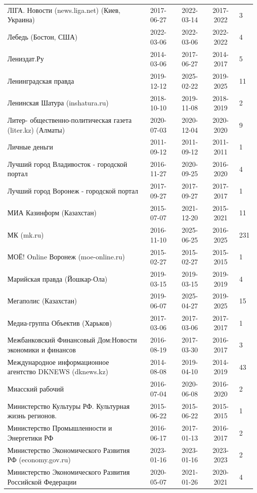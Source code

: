 \begin{longtable}{p{6cm}cccp{2cm}}
ЛIГА. Новости (news.liga.net) (Киев, Украина) & 2017-06-27 & 2022-03-14 & 2017-2022 & 3\\
Лебедь (Бостон, США) & 2022-03-06 & 2022-03-06 & 2022-2022 & 4\\
Лениздат.Ру & 2014-03-06 & 2017-06-27 & 2014-2017 & 5\\
Ленинградская правда & 2019-12-12 & 2025-02-22 & 2019-2025 & 11\\
Ленинская Шатура (inshatura.ru) & 2018-10-10 & 2019-11-08 & 2018-2019 & 2\\
Литер- общественно-политическая газета (liter.kz) (Алматы) & 2020-07-03 & 2020-12-04 & 2020-2020 & 9\\
Личные деньги & 2011-09-12 & 2011-09-12 & 2011-2011 & 1\\
Лучший город Владивосток - городской портал & 2016-11-27 & 2020-09-25 & 2016-2020 & 4\\
Лучший город Воронеж - городской портал & 2017-09-27 & 2017-09-27 & 2017-2017 & 1\\
МИА Казинформ (Казахстан) & 2015-07-07 & 2021-12-20 & 2015-2021 & 11\\
МК (mk.ru) & 2016-11-10 & 2025-06-25 & 2016-2025 & 231\\
МОЁ! Online Воронеж (moe-online.ru) & 2015-02-27 & 2015-02-27 & 2015-2015 & 1\\
Марийская правда (Йошкар-Ола) & 2019-03-15 & 2019-03-15 & 2019-2019 & 4\\
Мегаполис (Казахстан) & 2019-06-07 & 2025-04-27 & 2019-2025 & 15\\
Медиа-группа Объектив (Харьков) & 2017-03-06 & 2017-03-06 & 2017-2017 & 1\\
Межбанковский Финансовый Дом:Новости экономики и финансов & 2016-08-19 & 2017-03-30 & 2016-2017 & 3\\
Международное информационное агентство DKNEWS (dknews.kz) & 2014-08-08 & 2019-04-10 & 2014-2019 & 43\\
Миасский рабочий & 2016-07-04 & 2020-06-08 & 2016-2020 & 2\\
Министерство Культуры РФ. Культурная жизнь регионов. & 2015-06-22 & 2015-06-22 & 2015-2015 & 1\\
Министерство Промышленности и Энергетики РФ & 2016-06-17 & 2017-01-13 & 2016-2017 & 2\\
Министерство Экономического Развития РФ (economy.gov.ru) & 2023-01-16 & 2023-01-16 & 2023-2023 & 2\\
Министерство Экономического Развития Российской Федерации & 2020-05-07 & 2021-01-26 & 2020-2021 & 4\\

\end{longtable}

